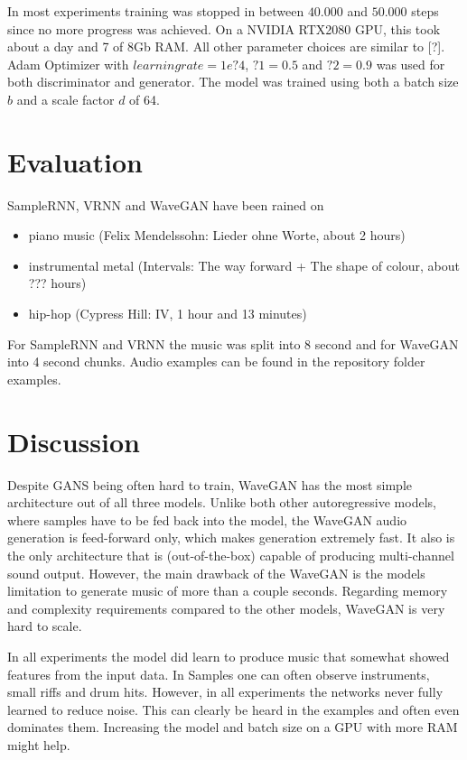 \documentclass[12pt]{article}
\begin{document}
In most experiments training was stopped in between $40.000$ and $50.000$ steps since no more progress was achieved.
On a NVIDIA RTX2080 GPU, this took about a day and 7 of 8Gb RAM.
All other parameter choices are similar to [?].
Adam Optimizer with $learning rate = 1e ? 4$, $?1 = 0.5$ and $?2 = 0.9$
was used for both discriminator and generator.
The model was trained using both a batch size $b$ and a scale factor $d$ of 64.


\section{Evaluation}
SampleRNN, VRNN and WaveGAN have been rained on
\begin{itemize}
 \item piano music (Felix Mendelssohn: Lieder ohne Worte, about 2 hours)
 \item instrumental metal (Intervals: The way forward + The shape of colour, about ??? hours)
 \item hip-hop (Cypress Hill: IV, 1 hour and 13 minutes)
\end{itemize}

For SampleRNN and VRNN the music was split into 8 second and for WaveGAN into 4 second chunks.
Audio examples can be found in the repository folder examples. %



\section{Discussion}
Despite GANS being often hard to train, WaveGAN has the most simple architecture out of all three models.
Unlike both other autoregressive models, where samples have to be fed back into the model, the WaveGAN audio generation is feed-forward only, which makes generation extremely fast.
It also is the only architecture that is (out-of-the-box) capable of producing multi-channel sound output.
However, the main drawback of the WaveGAN is the models limitation to generate music of more than a couple seconds.
Regarding memory and complexity requirements compared to the other models, WaveGAN is very hard to scale.

In all experiments the model did learn to produce music that somewhat showed features from the input data.
In Samples one can often observe instruments, small riffs and drum hits.
However, in all experiments the networks never fully learned to reduce noise.
This can clearly be heard in the examples and often even dominates them.
Increasing the model and batch size on a GPU with more RAM might help.
\end{document}
